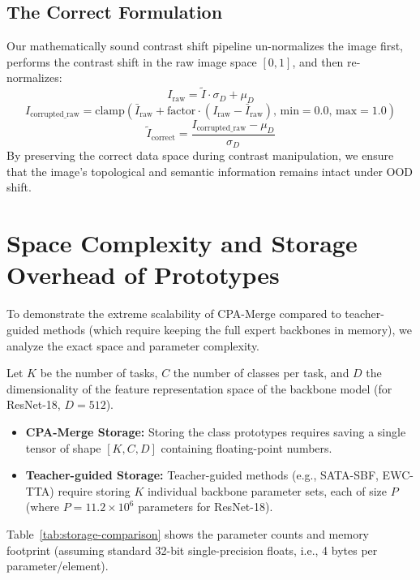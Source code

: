 \documentclass{article}
\theoremstyle{plain}
\theoremstyle{definition}
\theoremstyle{remark}
\begin{document}
\subsection{The Correct Formulation}
Our mathematically sound contrast shift pipeline un-normalizes the image first, performs the contrast shift in the raw image space $[0, 1]$, and then re-normalizes:
\begin{equation}
    I_{\text{raw}} = \tilde{I} \cdot \sigma_D + \mu_D
\end{equation}
\begin{equation}
    I_{\text{corrupted\_raw}} = \text{clamp}(\bar{I}_{\text{raw}} + \text{factor} \cdot (I_{\text{raw}} - \bar{I}_{\text{raw}}), \, \text{min}=0.0, \, \text{max}=1.0)
\end{equation}
\begin{equation}
    \tilde{I}_{\text{correct}} = \frac{I_{\text{corrupted\_raw}} - \mu_D}{\sigma_D}
\end{equation}
By preserving the correct data space during contrast manipulation, we ensure that the image's topological and semantic information remains intact under OOD shift.

\section{Space Complexity and Storage Overhead of Prototypes}
\label{appendix-complexity}

To demonstrate the extreme scalability of CPA-Merge compared to teacher-guided methods (which require keeping the full expert backbones in memory), we analyze the exact space and parameter complexity.

Let $K$ be the number of tasks, $C$ the number of classes per task, and $D$ the dimensionality of the feature representation space of the backbone model (for ResNet-18, $D=512$).
\begin{itemize}
    \item \textbf{CPA-Merge Storage:} Storing the class prototypes requires saving a single tensor of shape $[K, C, D]$ containing floating-point numbers.
    \item \textbf{Teacher-guided Storage:} Teacher-guided methods (e.g., SATA-SBF, EWC-TTA) require storing $K$ individual backbone parameter sets, each of size $P$ (where $P = 11.2 \times 10^6$ parameters for ResNet-18).
\end{itemize}

Table~\ref{tab:storage-comparison} shows the parameter counts and memory footprint (assuming standard 32-bit single-precision floats, i.e., 4 bytes per parameter/element).
\end{document}

